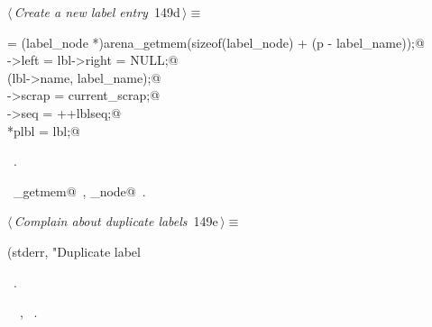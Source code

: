 \documentclass[a4paper]{report}
\begin{document}
\begin{flushleft} \small
\begin{minipage}{\linewidth}\label{scrap330}\raggedright\small
{} $\langle\,${\it Create a new label entry}\nobreak\ {\footnotesize {149d}}$\,\rangle\equiv$
\vspace{-1ex}
\begin{list}{}{} \item
\mbox{}\verb@lbl = (label_node *)arena_getmem(sizeof(label_node) + (p - label_name));@\\
\mbox{}\verb@lbl->left = lbl->right = NULL;@\\
\mbox{}\verb@strcpy(lbl->name, label_name);@\\
\mbox{}\verb@lbl->scrap = current_scrap;@\\
\mbox{}\verb@lbl->seq = ++lblseq;@\\
\mbox{}\verb@*plbl = lbl;@{\NWsep}
\end{list}
\vspace{-1.5ex}
\footnotesize
\begin{list}{}{\setlength{\itemsep}{-\parsep}\setlength{\itemindent}{-\leftmargin}}
\item \NWtxtMacroRefIn\ .
\item \NWtxtIdentsUsed\nobreak\  \verb@arena_getmem@\nobreak\ , \verb@label_node@\nobreak\ .
\item{}
\end{list}
\end{minipage}\vspace{4ex}
\end{flushleft}
\begin{flushleft} \small
\begin{minipage}{\linewidth}\label{scrap331}\raggedright\small
{} $\langle\,${\it Complain about duplicate labels}\nobreak\ {\footnotesize {149e}}$\,\rangle\equiv$
\vspace{-1ex}
\begin{list}{}{} \item
\mbox{}\verb@fprintf(stderr, "Duplicate label %s.\n", label_name);@{\NWsep}
\end{list}
\vspace{-1.5ex}
\footnotesize
\begin{list}{}{\setlength{\itemsep}{-\parsep}\setlength{\itemindent}{-\leftmargin}}
\item \NWtxtMacroRefIn\ .
\item \NWtxtIdentsUsed\nobreak\  \verb@fprintf@\nobreak\ , \verb@stderr@\nobreak\ .
\item{}
\end{list}
\end{minipage}\vspace{4ex}
\end{flushleft}
\end{document}

